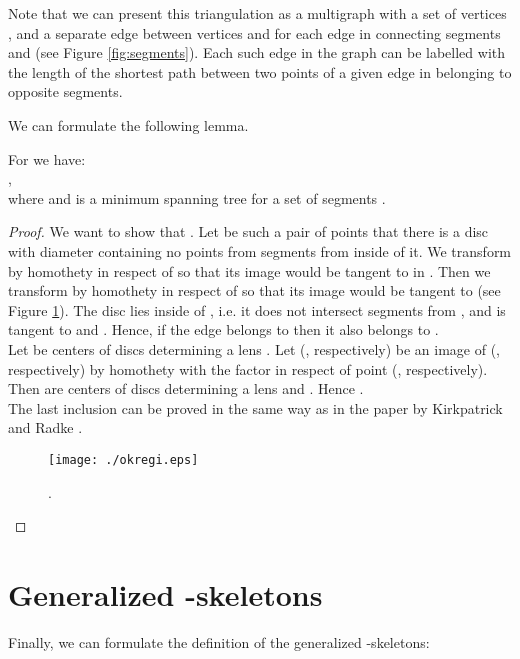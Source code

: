 \documentclass[11pt]{llncs}
\begin{document}
Note that we can present this triangulation as a multigraph  with a set of vertices , 
and a separate edge between vertices  and  for each edge in  connecting segments 
 and  (see Figure \ref{fig:segments}). Each such edge in the graph can be labelled with 
the length of the shortest path between two points of a given edge in  belonging to opposite 
segments.

We can formulate the following lemma.

\begin{lemma}
\label{gg-dt-s}
For  we have: \\ 
,\\
where  and  is a minimum spanning tree for a set 
of segments .
\end{lemma}
\begin{proof} 
We want to show that .
Let  be such a pair of points that there is a  disc  
with diameter  containing no points from segments from  inside of it. 
We transform  by homothety in respect of  so that its image  would be tangent to  
in . Then we transform  by homothety in respect of  so that its image  would be 
tangent to  (see Figure \ref{fig:gg-dt}). The disc  lies inside of , i.e. it does not 
intersect segments from , and is tangent to  and . Hence, 
if the edge  belongs to  then it also belongs to . \\
Let  be centers of discs determining a lens .
Let  (, respectively) be an image of  (, respectively)
by homothety with the factor  in respect of point  (, respectively).
Then  are centers of discs determining a lens 
and . Hence . \\
The last inclusion can be proved in the same way as in the paper by Kirkpatrick and Radke 
\cite{kr85}.   

\begin{figure}[htbp]
\centering
\texttt{[image: ./okregi.eps]}
\caption{.}
\label{fig:gg-dt}
\end{figure}  
\end{proof}


\section{Generalized -skeletons}

Finally, we can formulate the definition of the generalized -skeletons:
\end{document}
